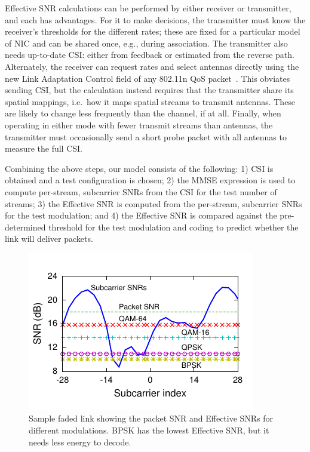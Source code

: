  Effective SNR calculations can be performed by either receiver or transmitter, and each has advantages. For it to make decisions, the transmitter must know the receiver's thresholds for the different rates; these are fixed for a particular model of NIC and can be shared once, e.g., during association. The transmitter also needs up-to-date CSI: either from feedback or estimated from the reverse path. Alternately, the receiver can request rates and select antennas directly using the new Link Adaptation Control field of any 802.11n QoS packet~\cite[\S7.1.3.5a]{80211n}. This obviates sending CSI, but the calculation instead requires that the transmitter share its spatial mappings, i.e.\ how it maps spatial streams to transmit antennas. These are likely to change less frequently than the channel, if at all. Finally, when operating in either mode with fewer transmit streams than antennas, the transmitter must occasionally send a short probe packet with all antennas to measure the full CSI\@.

 Combining the above steps, our model consists of the following: 1) CSI is obtained and a test configuration is chosen; 2) the MMSE expression is used to compute per-stream, subcarrier SNRs from the CSI for the test number of streams; 3) the Effective SNR is computed from the per-stream, subcarrier SNRs for the test modulation; and 4) the Effective SNR is compared against the pre-determined threshold for the test modulation and coding to predict whether the link will deliver packets.

\begin{figure}[t]
  \centering
  \includegraphics[width=0.9\columnwidth,viewport=0 9 180 111,clip]{figures/esnr/embed_fsf-shape-eff-snr-s3d5-txpower-20.pdf}
  \vspace{-4pt}
  \caption{Sample faded link showing the packet SNR and Effective SNRs for different modulations. BPSK has the lowest Effective SNR, but it needs less energy to decode.}
  \label{fig:eff_example}
  \vspace{-3pt}
\end{figure}


